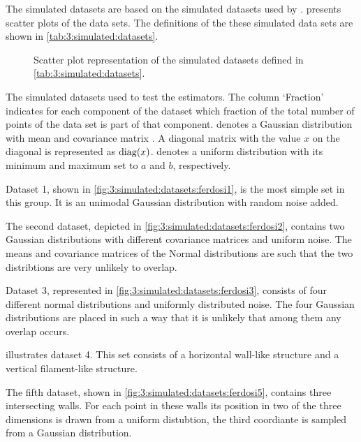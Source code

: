 
The simulated datasets are based on the simulated datasets used by \textcite{ferdosi2011comparison}.  presents scatter plots of the data sets. The definitions of the these simulated data sets are shown in \cref{tab:3:simulated:datasets}.

\begin{figure*}
	\centering
				
	\caption{Scatter plot representation of the simulated datasets defined in \cref{tab:3:simulated:datasets}. }
	\label{fig:3:simulated:datasets}
\end{figure*}

\begin{table*}
	\centering
	
	\caption{The simulated datasets used to test the estimators. The column `Fraction' indicates for each component of the dataset which fraction of the total number of points of the data set is part of that component. \gaussDist{\varMean}{\varCovarianceMatrix} denotes a Gaussian distribution with mean \varMean and covariance matrix \varCovarianceMatrix. A diagonal matrix with the value $x$ on the diagonal is represented as $\operatorname{diag}(x)$.  denotes a uniform distribution with its minimum and maximum set to $a$ and $b$, respectively.} 	
	\label{tab:3:simulated:datasets}
\end{table*}

	Dataset 1, shown in \cref{fig:3:simulated:datasets:ferdosi1}, is the most simple set in this group. It is an unimodal Gaussian distribution with random noise added. 

	The second dataset, depicted in \cref{fig:3:simulated:datasets:ferdosi2}, contains two Gaussian distributions with different covariance matrices and uniform noise. The means and covariance matrices of the Normal distributions are such that the two distribtions are very unlikely to overlap. 

	Dataset 3, represented in \cref{fig:3:simulated:datasets:ferdosi3}, consists of four different normal distributions and uniformly distributed noise. The four Gaussian distributions are placed in such a way that it is unlikely that among them any overlap occurs.

	 illustrates dataset 4. This set consists of a horizontal wall-like structure and a vertical filament-like structure. 

	The fifth dataset, shown in \cref{fig:3:simulated:datasets:ferdosi5}, contains three intersecting walls. For each point in these walls its position in two of the three dimensions is drawn from a uniform distubtion, the third coordiante is sampled from a Gaussian distribution.


